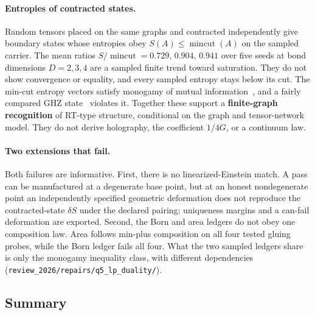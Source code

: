\paragraph{Entropies of contracted states.} Random tensors placed on the same graphs and contracted independently give
boundary states whose entropies obey \(S(A)\le\operatorname{mincut}(A)\) on the sampled carrier. The mean
ratios \(S/\operatorname{mincut}=0.729,\,0.904,\,0.941\) over five seeds at bond dimensions \(D=2,3,4\) are a sampled finite trend toward
saturation. They do not show convergence or equality, and every sampled entropy stays below its cut. The min-cut entropy
vectors satisfy monogamy of mutual information~\citep{HaydenHeadrickMaloney2013}, and a fairly compared GHZ
state~\citep{GHZ1989} violates it. Together these support a \textbf{finite-graph recognition} of RT-type structure,
conditional on the graph and tensor-network model. They do not derive holography, the coefficient \(1/4G\), or a
continuum law.

\paragraph{Two extensions that fail.} Both failures are informative. First, there is no linearized-Einstein match. A
pass can be manufactured at a degenerate base point, but at an honest nondegenerate point an independently specified
geometric deformation does not reproduce the contracted-state \(\delta S\) under the declared pairing; uniqueness
margins and a can-fail deformation are exported. Second, the Born and area ledgers do not obey one composition law.
Area follows min-plus composition on all four tested gluing probes, while the Born ledger fails all four. What the two
sampled ledgers share is only the monogamy inequality class, with different dependencies
(\nolinkurl{review_2026/repairs/q5_lp_duality/}).

\subsection{Summary}\label{result-qmgr-summary-table}

